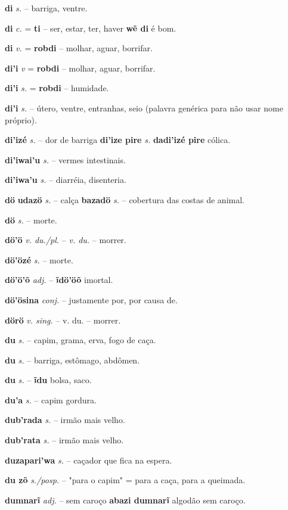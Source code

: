 \textbf{di} \textit{s.} -- barriga, ventre.

\textbf{di} \textit{c.} = \textbf{ti} -- ser, estar, ter, haver  \textbf{wẽ di} é bom.

\textbf{di} \textit{v.} = \textbf{robdi} -- molhar, aguar, borrifar.

\textbf{di'i} \textit{v} = \textbf{robdi} -- molhar, aguar, borrifar.

\textbf{di'i} \textit{s.} = \textbf{robdi} -- humidade.

\textbf{di'i} \textit{s.} -- útero, ventre, entranhas, seio (palavra genérica para não usar nome próprio).

\textbf{di'izé} \textit{s.} -- dor de barriga  \textbf{di'ize pire} \textit{s.} \textbf{dadi'izé pire} cólica.

\textbf{di'iwai'u} \textit{s.} -- vermes intestinais.

\textbf{di'iwa'u} \textit{s.} -- diarréia, disenteria.

\textbf{dö}  \textbf{udazö} \textit{s.} -- calça  \textbf{bazadö} \textit{s.} -- cobertura das costas de animal.

\textbf{dö} \textit{s.} -- morte.

\textbf{dö'ö} \textit{v. du./pl.} -- \textit{v. du.} -- morrer.

\textbf{dö'özé} \textit{s.} -- morte.

\textbf{dö'ö'õ} \textit{adj.} -- \textbf{ĩdö'öõ} imortal.

\textbf{dö'ösina} \textit{conj.} -- justamente por, por causa de.

\textbf{dörö} \textit{v. sing.} -- v. du. -- morrer.

\textbf{du} \textit{s.} -- capim, grama, erva, fogo de caça.

\textbf{du} \textit{s.} -- barriga, estômago, abdômen.

\textbf{du} \textit{s.} -- \textbf{ĩdu} bolsa, saco.

\textbf{du'a} \textit{s.} -- capim gordura.

\textbf{dub'rada} \textit{s.} -- irmão mais velho.

\textbf{dub'rata} \textit{s.} -- irmão mais velho.

\textbf{duzapari'wa} \textit{s.} -- caçador que fica na espera.

\textbf{du zõ} \textit{s./posp.} -- "para o capim" = para a caça, para a queimada.

\textbf{dumnarĩ} \textit{adj.} -- sem caroço  \textbf{abazi dumnarĩ} algodão sem caroço.

